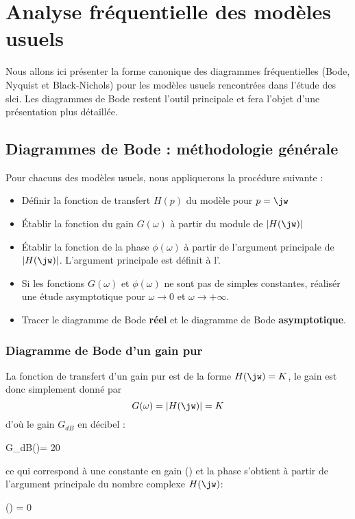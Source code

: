 \newpage
\section{Analyse fréquentielle des modèles usuels}

Nous allons ici présenter la forme canonique des diagrammes fréquentielles (Bode, Nyquist et Black-Nichols) pour 
les modèles usuels rencontrées dans l'étude des \gls{slci}. Les diagrammes de Bode restent l'outil principale et fera 
l'objet d'une présentation plus détaillée.

\subsection{Diagrammes de Bode : méthodologie générale}
Pour chacuns des modèles usuels, nous appliquerons la procédure suivante :
\begin{itemize}
    \item Définir la fonction de transfert $H(p)$ du modèle pour $p=\jw$
    \item \'Etablir la fonction du gain $G(\omega)$ à partir du module de $|H(\jw)|$
    \item \'Etablir la fonction de la phase $\phi(\omega)$ à partir de l'argument principale de $|H(\jw)|$.
          L'argument principale est définit à l'.
    \item Si les fonctions $G(\omega)$ et $\phi(\omega)$ ne sont pas de simples constantes, réalisér une étude
        asymptotique pour $\omega\rightarrow 0$ et $\omega\rightarrow +\infty$.
    \item Tracer le diagramme de Bode \textbf{réel} et le diagramme de Bode \textbf{asymptotique}.
\end{itemize}

\newpage
\subsubsection{Diagramme de Bode d'un gain pur}
La fonction de transfert d'un gain pur est de la forme $H(\jw)=K$,
le gain est donc simplement donné par 
$$
G(\omega)=|H(\jw)|=K
$$ 
d'où le gain $G_{dB}$ en décibel :
\begin{bequation}
G_{dB}(\omega)= 20
\end{bequation} ce qui correspond à une constante en gain () 
et la phase s'obtient à partir de l'argument principale du nombre complexe $H(\jw)$:
\begin{bequation}
\phi(\omega) = 0
\end{bequation}

